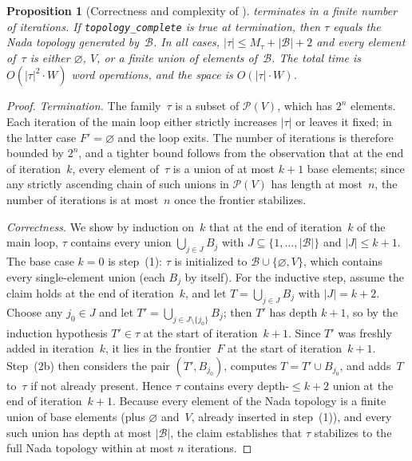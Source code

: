 \documentclass[11pt,a4paper]{article}
\theoremstyle{plain}
\newtheorem{proposition}[theorem]{Proposition}
\theoremstyle{definition}
\newcommand{\powerset}{\mathcal{P}}
\newcommand{\base}{\mathcal{B}}
\begin{document}
\begin{proposition}[Correctness and complexity of ]%
\label{prop:union-closure-correct}
 terminates in a finite number of iterations.
If \texttt{topology\_complete} is \textup{true} at termination, then
$\tau$ equals the Nada topology generated by~$\base$.  In all cases,
$|\tau| \leq M_{\tau} + |\base| + 2$ and every element of~$\tau$ is
either $\varnothing$, $V$, or a finite union of elements of~$\base$.
The total time is $O(|\tau|^{2} \cdot W)$ word operations, and the
space is $O(|\tau| \cdot W)$.
\end{proposition}

\begin{proof}
\emph{Termination.}  The family~$\tau$ is a subset of $\powerset(V)$,
which has $2^{n}$ elements.  Each iteration of the main loop either
strictly increases $|\tau|$ or leaves it fixed; in the latter case
$F' = \varnothing$ and the loop exits.  The number of iterations is
therefore bounded by $2^{n}$, and a tighter bound follows from the
observation that at the end of iteration~$k$, every element of~$\tau$
is a union of at most $k + 1$ base elements; since any strictly
ascending chain of such unions in $\powerset(V)$ has length at
most~$n$, the number of iterations is at most~$n$ once the frontier
stabilizes.

\emph{Correctness.}  We show by induction on~$k$ that at the end of
iteration~$k$ of the main loop, $\tau$ contains every union
$\bigcup_{j \in J} B_j$ with $J \subseteq \{1, \ldots, |\base|\}$ and
$|J| \leq k + 1$.  The base case $k = 0$ is step~(1): $\tau$ is
initialized to $\base \cup \{\varnothing, V\}$, which contains every
single-element union (each $B_j$ by itself).  For the inductive step,
assume the claim holds at the end of iteration~$k$, and let
$T = \bigcup_{j \in J} B_j$ with $|J| = k + 2$.  Choose any
$j_{0} \in J$ and let $T' = \bigcup_{j \in J \setminus \{j_{0}\}} B_j$;
then $T'$ has depth $k + 1$, so by the induction hypothesis
$T' \in \tau$ at the start of iteration~$k + 1$.  Since $T'$ was
freshly added in iteration~$k$, it lies in the frontier~$F$ at the
start of iteration~$k + 1$.  Step~(2b) then considers the pair
$(T', B_{j_{0}})$, computes $T = T' \cup B_{j_{0}}$, and adds~$T$
to~$\tau$ if not already present.  Hence $\tau$ contains every
depth-$\leq\! k + 2$ union at the end of iteration~$k + 1$.  Because
every element of the Nada topology is a finite union of base elements
(plus $\varnothing$ and~$V$, already inserted in step~(1)), and every
such union has depth at most $|\base|$, the claim establishes that
$\tau$ stabilizes to the full Nada topology within at most $n$
iterations.


\end{proof}
\end{document}
